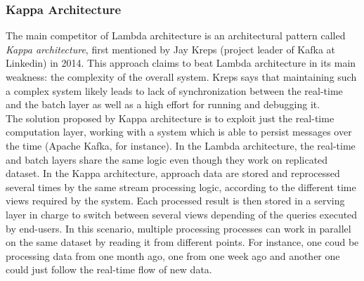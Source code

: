 \subsubsection{Kappa Architecture}
The main competitor of Lambda architecture is an architectural pattern called \textit{Kappa architecture}\cite{bib9}, first mentioned by Jay Kreps (project leader of Kafka at Linkedin) in 2014. This approach claims to beat Lambda architecture in its main weakness: the complexity of the overall system. Kreps says that maintaining such a complex system likely leads to lack of synchronization between the real-time and the batch layer as well as a high effort for running and debugging it.\\
The solution proposed by Kappa architecture is to exploit just the real-time computation layer, working with a system which is able to persist messages over the time (Apache Kafka, for instance). In the Lambda architecture, the real-time and batch layers share the same logic even though they work on replicated dataset. In the Kappa architecture, approach data are stored and reprocessed several times by the same stream processing logic, according to the different time views required by the system. Each processed result is then stored in a serving layer in charge to switch between several views depending of the queries executed by end-users. In this scenario, multiple processing processes can work in parallel on the same dataset by reading it from different points. For instance, one coud be processing data from one month ago, one from one week ago and another one could just follow the real-time flow of new data.
